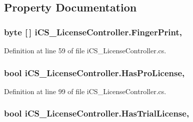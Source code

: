 \subsection{Property Documentation}
\hypertarget{classi_c_s___license_controller_aaf6a83d8885786f9bdd0a92e6bd73ca3}{
\subsubsection[{Finger\+Print}]{\setlength{\rightskip}{0pt plus 5cm}byte \mbox{[}$\,$\mbox{]} i\+C\+S\+\_\+\+License\+Controller.\+Finger\+Print\hspace{0.3cm}{\ttfamily [static]}, {\ttfamily [get]}}}\label{classi_c_s___license_controller_aaf6a83d8885786f9bdd0a92e6bd73ca3}


Definition at line 59 of file i\+C\+S\+\_\+\+License\+Controller.\+cs.

\hypertarget{classi_c_s___license_controller_a11ad9bb7ce1860b1a59e24dfd2a907be}{
\subsubsection[{Has\+Pro\+License}]{\setlength{\rightskip}{0pt plus 5cm}bool i\+C\+S\+\_\+\+License\+Controller.\+Has\+Pro\+License\hspace{0.3cm}{\ttfamily [static]}, {\ttfamily [get]}}}\label{classi_c_s___license_controller_a11ad9bb7ce1860b1a59e24dfd2a907be}


Definition at line 99 of file i\+C\+S\+\_\+\+License\+Controller.\+cs.

\hypertarget{classi_c_s___license_controller_a99af54ac6e40c4780dd1d4e773a7c237}{
\subsubsection[{Has\+Trial\+License}]{\setlength{\rightskip}{0pt plus 5cm}bool i\+C\+S\+\_\+\+License\+Controller.\+Has\+Trial\+License\hspace{0.3cm}{\ttfamily [static]}, {\ttfamily [get]}}}\label{classi_c_s___license_controller_a99af54ac6e40c4780dd1d4e773a7c237}


